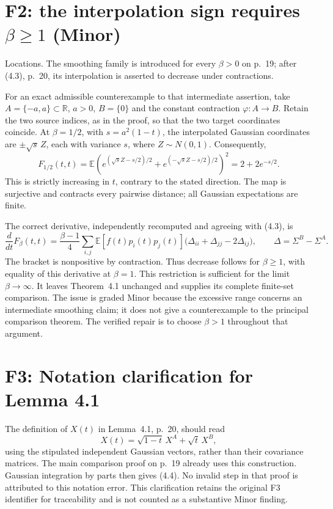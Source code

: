 \documentclass[10pt]{article}
\begin{document}
\section*{F2: the interpolation sign requires \(\beta\ge1\) (Minor)}
Locations. The smoothing family is introduced for every \(\beta>0\) on p. 19; after (4.3), p. 20, its interpolation is asserted to decrease under contractions.\par
For an exact admissible counterexample to that intermediate assertion, take \(A=\{-a,a\}\subset\mathbb R\), \(a>0\), \(B=\{0\}\) and the constant contraction \(\varphi:A\to B\). Retain the two source indices, as in the proof, so that the two target coordinates coincide. At \(\beta=1/2\), with \(s=a^2(1-t)\), the interpolated Gaussian coordinates are \(\pm\sqrt{s}\,Z\), each with variance \(s\), where \(Z\sim N(0,1)\). Consequently, \[F_{1/2}(t,t)
 =\mathbb E\!\left(e^{(\sqrt{s}Z-s/2)/2}
            +e^{(-\sqrt{s}Z-s/2)/2}\right)^2
 =2+2e^{-s/2}.\] This is strictly increasing in \(t\), contrary to the stated direction. The map is surjective and contracts every pairwise distance; all Gaussian expectations are finite.\par
The correct derivative, independently recomputed and agreeing with (4.3), is \[\frac{d}{dt}F_\beta(t,t)
 =\frac{\beta-1}{4}
 \sum_{i,j}\mathbb E[f(t)p_i(t)p_j(t)]
 \bigl(\Delta_{ii}+\Delta_{jj}-2\Delta_{ij}\bigr),
 \qquad \Delta=\Sigma^B-\Sigma^A.\] The bracket is nonpositive by contraction. Thus decrease follows for \(\beta\ge1\), with equality of this derivative at \(\beta=1\). This restriction is sufficient for the limit \(\beta\to\infty\). It leaves Theorem 4.1 unchanged and supplies its complete finite-set comparison. The issue is graded Minor because the excessive range concerns an intermediate smoothing claim; it does not give a counterexample to the principal comparison theorem. The verified repair is to choose \(\beta>1\) throughout that argument.\par
\section*{F3: Notation clarification for Lemma 4.1}
The definition of \(X(t)\) in Lemma 4.1, p. 20, should read \[X(t)=\sqrt{1-t}\,X^A+\sqrt t\,X^B,\] using the stipulated independent Gaussian vectors, rather than their covariance matrices. The main comparison proof on p. 19 already uses this construction. Gaussian integration by parts then gives (4.4). No invalid step in that proof is attributed to this notation error. This clarification retains the original F3 identifier for traceability and is not counted as a substantive Minor finding.\par
\end{document}
